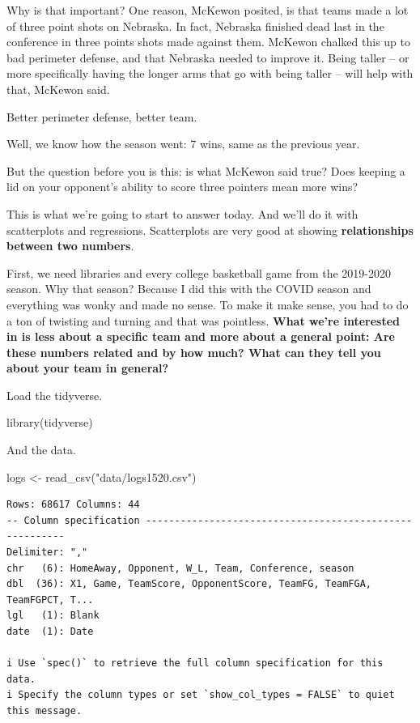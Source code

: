 \documentclass[
  letterpaper,
  DIV=11,
  numbers=noendperiod]{scrreprt}
\newenvironment{Shaded}{\begin{snugshade}}{\end{snugshade}}
\newcommand{\FunctionTok}[1]{\textcolor[rgb]{0.28,0.35,0.67}{#1}}
\newcommand{\NormalTok}[1]{\textcolor[rgb]{0.00,0.23,0.31}{#1}}
\newcommand{\OtherTok}[1]{\textcolor[rgb]{0.00,0.23,0.31}{#1}}
\newcommand{\StringTok}[1]{\textcolor[rgb]{0.13,0.47,0.30}{#1}}
\begin{document}
Why is that important? One reason, McKewon posited, is that teams made a
lot of three point shots on Nebraska. In fact, Nebraska finished dead
last in the conference in three points shots made against them. McKewon
chalked this up to bad perimeter defense, and that Nebraska needed to
improve it. Being taller -- or more specifically having the longer arms
that go with being taller -- will help with that, McKewon said.

Better perimeter defense, better team.

Well, we know how the season went: 7 wins, same as the previous year.

But the question before you is this: is what McKewon said true? Does
keeping a lid on your opponent's ability to score three pointers mean
more wins?

This is what we're going to start to answer today. And we'll do it with
scatterplots and regressions. Scatterplots are very good at showing
\textbf{relationships between two numbers}.

First, we need libraries and every college basketball game from the
2019-2020 season. Why that season? Because I did this with the COVID
season and everything was wonky and made no sense. To make it make
sense, you had to do a ton of twisting and turning and that was
pointless. \textbf{What we're interested in is less about a specific
team and more about a general point: Are these numbers related and by
how much? What can they tell you about your team in general?}

Load the tidyverse.

\begin{Shaded}
\begin{Highlighting}[]
\FunctionTok{library}\NormalTok{(tidyverse)}
\end{Highlighting}
\end{Shaded}

And the data.

\begin{Shaded}
\begin{Highlighting}[]
\NormalTok{logs }\OtherTok{\textless{}{-}} \FunctionTok{read\_csv}\NormalTok{(}\StringTok{"data/logs1520.csv"}\NormalTok{)}
\end{Highlighting}
\end{Shaded}

\begin{verbatim}
Rows: 68617 Columns: 44
-- Column specification --------------------------------------------------------
Delimiter: ","
chr   (6): HomeAway, Opponent, W_L, Team, Conference, season
dbl  (36): X1, Game, TeamScore, OpponentScore, TeamFG, TeamFGA, TeamFGPCT, T...
lgl   (1): Blank
date  (1): Date

i Use `spec()` to retrieve the full column specification for this data.
i Specify the column types or set `show_col_types = FALSE` to quiet this message.
\end{verbatim}
\end{document}
